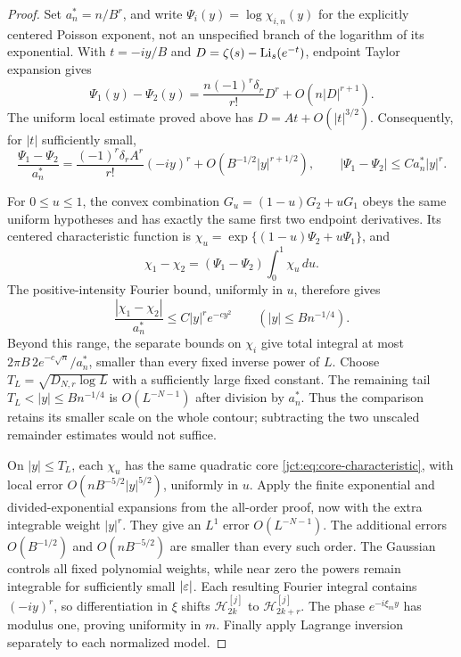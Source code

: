 \begin{proof}
Set $a_n^*=n/B^r$, and write $\Psi_i(y)=\log\chi_{i,n}(y)$
for the explicitly centered Poisson exponent, not an unspecified branch
of the logarithm of its exponential. With $t=-iy/B$ and
$D=\zeta(s)-\operatorname{Li}_s(e^{-t})$, endpoint Taylor expansion gives
\begin{equation}\label{jct:eq:matched-exponent}
 \Psi_1(y)-\Psi_2(y)
 =\frac{n(-1)^r\delta_r}{r!}D^r+O(n|D|^{r+1}).
\end{equation}
The uniform local estimate proved above has $D=At+O(|t|^{3/2})$.
Consequently, for $|t|$ sufficiently small,
\[
 \frac{\Psi_1-\Psi_2}{a_n^*}
 =\frac{(-1)^r\delta_r A^r}{r!}(-iy)^r
       +O(B^{-1/2}|y|^{r+1/2}),
 \qquad |\Psi_1-\Psi_2|\le C a_n^*|y|^r.
\]

For $0\le u\le1$, the convex combination
$G_u=(1-u)G_2+uG_1$ obeys the same uniform hypotheses and has exactly
the same first two endpoint derivatives. Its centered characteristic
function is $\chi_u=\exp\{(1-u)\Psi_2+u\Psi_1\}$, and
\begin{equation}\label{jct:eq:convex-difference}
 \chi_1-\chi_2=(\Psi_1-\Psi_2)\int_0^1\chi_u\,du.
\end{equation}
The positive-intensity Fourier bound, uniformly in $u$, therefore gives
\[
 \frac{|\chi_1-\chi_2|}{a_n^*}
 \le C|y|^r e^{-c y^2}\qquad(|y|\le Bn^{-1/4}).
\]
Beyond this range, the separate bounds on $\chi_i$ give total integral
at most $2\pi B\,2e^{-c\sqrt n}/a_n^*$, smaller than every fixed
inverse power of $L$. Choose $T_L=\sqrt{D_{N,r}\log L}$ with a
sufficiently large fixed constant. The remaining tail
$T_L<|y|\le Bn^{-1/4}$ is $O(L^{-N-1})$ after division by $a_n^*$.
Thus the comparison retains its smaller scale on the whole contour;
subtracting the two unscaled remainder estimates would not suffice.

On $|y|\le T_L$, each $\chi_u$ has the same quadratic core
\eqref{jct:eq:core-characteristic}, with local error
$O(nB^{-5/2}|y|^{5/2})$, uniformly in $u$. Apply the finite exponential
and divided-exponential expansions from the all-order proof, now with
the extra integrable weight $|y|^r$. They give an $L^1$ error
$O(L^{-N-1})$. The additional errors $O(B^{-1/2})$ and
$O(nB^{-5/2})$ are smaller than every such order. The Gaussian controls
all fixed polynomial weights, while near zero the powers remain
integrable for sufficiently small $|\varepsilon|$. Each resulting Fourier
integral contains $(-iy)^r$, so differentiation in $\xi$ shifts
$\mathcal{H}_{2k}^{[j]}$ to $\mathcal{H}_{2k+r}^{[j]}$.
The phase $e^{-i\xi_m y}$ has modulus one, proving uniformity in $m$.
Finally apply Lagrange inversion separately to each normalized model.
\end{proof}

